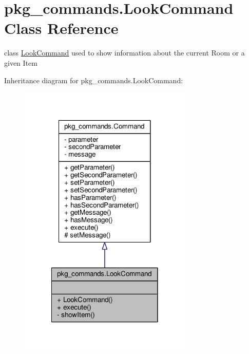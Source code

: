 \hypertarget{classpkg__commands_1_1LookCommand}{\section{pkg\-\_\-commands.\-Look\-Command Class Reference}
\label{classpkg__commands_1_1LookCommand}
}


class \hyperlink{classpkg__commands_1_1LookCommand}{Look\-Command} used to show information about the current Room or a given Item  




Inheritance diagram for pkg\-\_\-commands.\-Look\-Command\-:
\nopagebreak
\begin{figure}[H]
\begin{center}
\leavevmode
\includegraphics[width=234pt]{classpkg__commands_1_1LookCommand__inherit__graph}
\end{center}
\end{figure}


